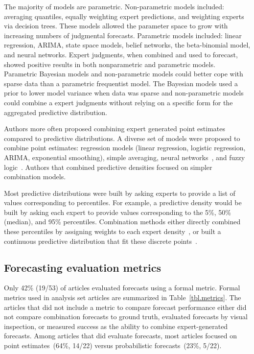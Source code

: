 \documentclass[preprint]{elsarticle}
\begin{document}
The majority of models are parametric.
Non-parametric models included: averaging quantiles, equally weighting expert predictions, and weighting experts via decision trees.
These models allowed the parameter space to grow with increasing numbers of judgmental forecasts.
Parametric models included: linear regression, ARIMA, state space models, belief networks, the beta-binomial model, and neural networks.
Expert judgments, when combined and used to forecast, showed positive results in both nonparametric and parametric models.
Parametric Bayesian models and non-parametric models could better cope with sparse data than a parametric frequentist model.
The Bayesian models used a prior to lower model variance when data was sparse and non-parametric models could combine a expert judgments without relying on a specific form for the aggregated predictive distribution.

Authors more often proposed combining expert generated point estimates compared to predictive distributions.
A diverse set of models were proposed to combine point estimates: regression models (linear regression, logistic regression, ARIMA, exponential smoothing), simple averaging, neural networks~\cite{cabello2012combination,adams2009acceptability,mak1996aggregating,graefe2014combining,baron2014two}, and fuzzy logic~\cite{petrovic2006fuzzy,kabak2008aggregating,jana2019interval,ren2002optimal}.
Authors that combined predictive densities focused on simpler combination models.

Most predictive distributions were built by asking experts to provide a list of values corresponding to percentiles.
For example, a predictive density would be built by asking each expert to provide values corresponding to the 5\%, 50\% (median), and 95\% percentiles.
Combination methods either directly combined these percentiles by assigning weights to each expert density~\cite{ISI:000327676900001,hanea2018value,morales2017characterization,cai2016simple,ISI:000391078100005,kabak2008aggregating,zio1997accounting,BRITO201655}, or built a continuous predictive distribution that fit these discrete points~\cite{brito2012behavioral,abramson1996hailfinder,neves2008life,failing2004using,wang2008probabilistic,kurowicka2010probabilistic}.

\subsection{Forecasting evaluation metrics}
Only 42\% (19/53) of articles evaluated forecasts using a formal metric.
Formal metrics used in analysis set articles are summarized in Table~\ref{tbl.metrics}.
The articles that did not include a metric to compare forecast performance either did not compare combination forecasts to ground truth, evaluated forecasts by visual inspection, or measured success as the ability to combine expert-generated forecasts.
Among articles that did evaluate forecasts, most articles focused on point estimates~(64\%, 14/22) versus probabilistic forecasts~(23\%, 5/22).
\end{document}
